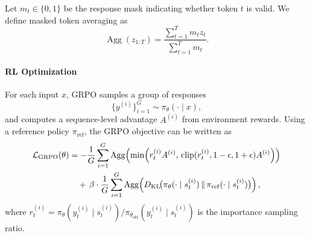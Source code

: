 \documentclass{article} %
\begin{document}
Let $m_t \in \{0,1\}$ be the response mask indicating whether token $t$ is valid.
We define masked token averaging as
\[
\operatorname{Agg}(z_{1:T})
=
\frac{\sum_{t=1}^{T} m_t z_t}{\sum_{t=1}^{T} m_t}.
\]


\paragraph{RL Optimization} For each input $x$, GRPO samples a group of responses
\[
\{y^{(i)}\}_{i=1}^{G} \sim \pi_{\theta}(\cdot \mid x),
\]
and computes a sequence-level advantage $A^{(i)}$ from environment rewards.
Using a reference policy $\pi_{\mathrm{ref}}$, the GRPO objective can be written as
\begin{align}
\mathcal{L}_{\text{GRPO}}(\theta)
&=
-\frac{1}{G}\sum_{i=1}^{G}
\operatorname{Agg}\!\left(
\min\!\Big(
r_{t}^{(i)} A^{(i)},\,
\operatorname{clip}(r_{t}^{(i)},1-\epsilon,1+\epsilon)A^{(i)}
\Big)
\right)
\notag\\
&\quad
+\,\beta \cdot
\frac{1}{G}\sum_{i=1}^{G}
\operatorname{Agg}\!\left(
D_{\mathrm{KL}}\!\big(
\pi_{\theta}(\cdot \mid s_t^{(i)})
\,\|\,
\pi_{\mathrm{ref}}(\cdot \mid s_t^{(i)})
\big)
\right),
\end{align}
where $r_t^{(i)}=\pi_{\theta}(y_t^{(i)} \mid s_t^{(i)}) / \pi_{\theta_{\mathrm{old}}}(y_t^{(i)} \mid s_t^{(i)})$ is the importance sampling ratio.



\end{document}
